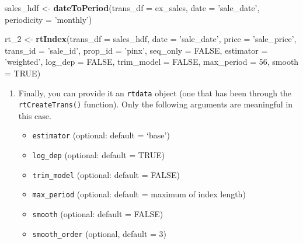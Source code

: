 \documentclass[]{article}
\newenvironment{Shaded}{\begin{snugshade}}{\end{snugshade}}
\newcommand{\DataTypeTok}[1]{\textcolor[rgb]{0.13,0.29,0.53}{#1}}
\newcommand{\DecValTok}[1]{\textcolor[rgb]{0.00,0.00,0.81}{#1}}
\newcommand{\KeywordTok}[1]{\textcolor[rgb]{0.13,0.29,0.53}{\textbf{#1}}}
\newcommand{\NormalTok}[1]{#1}
\newcommand{\OtherTok}[1]{\textcolor[rgb]{0.56,0.35,0.01}{#1}}
\newcommand{\StringTok}[1]{\textcolor[rgb]{0.31,0.60,0.02}{#1}}
\providecommand{\tightlist}{%
  \setlength{\itemsep}{0pt}\setlength{\parskip}{0pt}}
\begin{document}
\begin{Shaded}
\begin{Highlighting}[]

\NormalTok{  sales_hdf <-}\StringTok{ }\KeywordTok{dateToPeriod}\NormalTok{(}\DataTypeTok{trans_df =}\NormalTok{ ex_sales,}
                            \DataTypeTok{date =} \StringTok{'sale_date'}\NormalTok{,}
                            \DataTypeTok{periodicity =} \StringTok{'monthly'}\NormalTok{)}
\end{Highlighting}
\end{Shaded}

\begin{Shaded}
\begin{Highlighting}[]
\NormalTok{  rt_}\DecValTok{2}\NormalTok{ <-}\StringTok{ }\KeywordTok{rtIndex}\NormalTok{(}\DataTypeTok{trans_df =}\NormalTok{ sales_hdf,}
                  \DataTypeTok{date =} \StringTok{'sale_date'}\NormalTok{,}
                  \DataTypeTok{price =} \StringTok{'sale_price'}\NormalTok{,}
                  \DataTypeTok{trans_id =} \StringTok{'sale_id'}\NormalTok{,}
                  \DataTypeTok{prop_id =} \StringTok{'pinx'}\NormalTok{,}
                  \DataTypeTok{seq_only =} \OtherTok{FALSE}\NormalTok{,}
                  \DataTypeTok{estimator =} \StringTok{'weighted'}\NormalTok{,}
                  \DataTypeTok{log_dep =} \OtherTok{FALSE}\NormalTok{,}
                  \DataTypeTok{trim_model =} \OtherTok{FALSE}\NormalTok{,}
                  \DataTypeTok{max_period =} \DecValTok{56}\NormalTok{,}
                  \DataTypeTok{smooth =} \OtherTok{TRUE}\NormalTok{)}
\end{Highlighting}
\end{Shaded}

\begin{enumerate}
\def\labelenumi{\arabic{enumi}.}
\setcounter{enumi}{2}
\item
  Finally, you can provide it an \texttt{rtdata} object (one that has
  been through the \texttt{rtCreateTrans()} function). Only the
  following arguments are meaningful in this case.

  \begin{itemize}
  \tightlist
  \item
    \texttt{estimator} (optional: default = `base')
  \item
    \texttt{log\_dep} (optional: default = TRUE)
  \item
    \texttt{trim\_model} (optional: default = FALSE)
  \item
    \texttt{max\_period} (optional: default = maximum of index length)
  \item
    \texttt{smooth} (optional: default = FALSE)
  \item
    \texttt{smooth\_order} (optional, default = 3)
  \end{itemize}
\end{enumerate}
\end{document}
